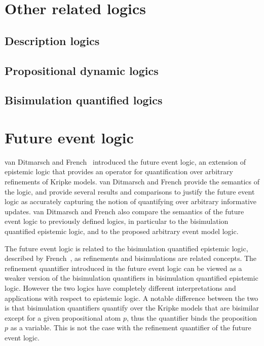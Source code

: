 \section{Other related logics}

\subsection{Description logics}

\subsection{Propositional dynamic logics}

\subsection{Bisimulation quantified logics}

\section{Future event logic}

van Ditmarsch and French~\cite{french2009simulation} introduced the future event
logic, an extension of epistemic logic that provides an operator for
quantification over arbitrary refinements of Kripke models. van Ditmarsch and
French provide the semantics of the logic, and provide several results and
comparisons to justify the future event logic as accurately capturing the notion
of quantifying over arbitrary informative updates. van Ditmarsch and French also 
compare the semantics of the future event logic to previously defined logics, in
particular to the bisimulation quantified epistemic logic, and to the proposed
arbitrary event model logic.

The future event logic is related to the bisimulation quantified epistemic
logic, described by French~\cite{french2006bisimulation}, as refinements and
bisimulations are related concepts. The refinement quantifier introduced in the
future event logic can be viewed as a weaker version of the bisimulation
quantifiers in bisimulation quantified epistemic logic. However the two logics
have completely different interpretations and applications with respect to
epistemic logic. A notable difference between the two is that bisimulation
quantifiers quantify over the Kripke models that are bisimilar except for a
given propositional atom $p$, thus the quantifier binds the proposition $p$ as a
variable. This is not the case with the refinement quantifier of the future
event logic. %

